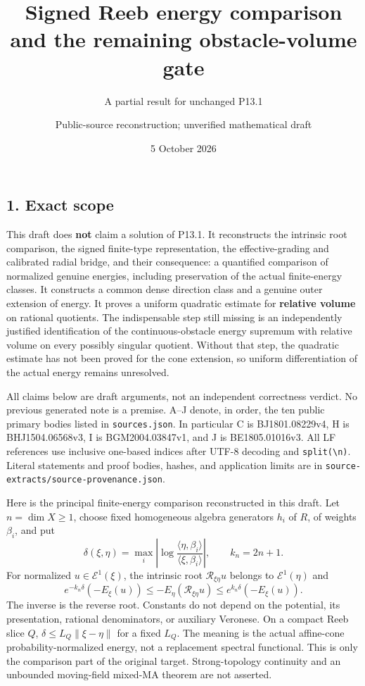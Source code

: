 \documentclass[
  11pt,
]{article}
\title{Signed Reeb energy comparison and the remaining obstacle-volume
gate}
\subtitle{A partial result for unchanged P13.1}
\author{Public-source reconstruction; unverified mathematical draft}
\date{5 October 2026}
\begin{document}
\maketitle

\subsection{1. Exact scope}\label{exact-scope}

This draft does \textbf{not} claim a solution of P13.1. It reconstructs
the intrinsic root comparison, the signed finite-type representation,
the effective-grading and calibrated radial bridge, and their
consequence: a quantified comparison of normalized genuine energies,
including preservation of the actual finite-energy classes. It
constructs a common dense direction class and a genuine outer extension
of energy. It proves a uniform quadratic estimate for \textbf{relative
volume} on rational quotients. The indispensable step still missing is
an independently justified identification of the continuous-obstacle
energy supremum with relative volume on every possibly singular
quotient. Without that step, the quadratic estimate has not been proved
for the cone extension, so uniform differentiation of the actual energy
remains unresolved.

All claims below are draft arguments, not an independent correctness
verdict. No previous generated note is a premise. A--J denote, in order,
the ten public primary bodies listed in \texttt{sources.json}. In
particular C is BJ1801.08229v4, H is BHJ1504.06568v3, I is
BGM2004.03847v1, and J is BE1805.01016v3. All LF references use
inclusive one-based indices after UTF-8 decoding and
\texttt{split(\textquotesingle{}\textbackslash{}n\textquotesingle{})}.
Literal statements and proof bodies, hashes, and application limits are
in \texttt{source-extracts/source-provenance.json}.

Here is the principal finite-energy comparison reconstructed in this
draft. Let \(n=\dim X\geq1\), choose fixed homogeneous algebra
generators \(h_i\) of \(R\), of weights \(\beta_i\), and put \[
 \delta(\xi,\eta)=\max_i\left|\log\frac{\langle\eta,\beta_i\rangle}{\langle\xi,\beta_i\rangle}\right|,
 \qquad k_n=2n+1.
\] For normalized \(u\in\mathcal E^1(\xi)\), the intrinsic root
\(\mathcal R_{\xi\eta}u\) belongs to \(\mathcal E^1(\eta)\) and \[
 e^{-k_n\delta}(-E_\xi(u))\leq
 -E_\eta(\mathcal R_{\xi\eta}u)\leq e^{k_n\delta}(-E_\xi(u)).                 \tag{1}
\] The inverse is the reverse root. Constants do not depend on the
potential, its presentation, rational denominators, or auxiliary
Veronese. On a compact Reeb slice \(Q\), \(\delta\leq L_Q\|\xi-\eta\|\)
for a fixed \(L_Q\). The meaning is the actual affine-cone
probability-normalized energy, not a replacement spectral functional.
This is only the comparison part of the original target. Strong-topology
continuity and an unbounded moving-field mixed-MA theorem are not
asserted.
\end{document}
